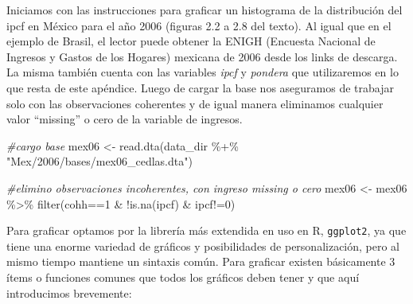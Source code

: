 \documentclass[
]{book}
\newenvironment{Shaded}{\begin{snugshade}}{\end{snugshade}}
\newcommand{\CommentTok}[1]{\textcolor[rgb]{0.56,0.35,0.01}{\textit{#1}}}
\newcommand{\DecValTok}[1]{\textcolor[rgb]{0.00,0.00,0.81}{#1}}
\newcommand{\FunctionTok}[1]{\textcolor[rgb]{0.00,0.00,0.00}{#1}}
\newcommand{\NormalTok}[1]{#1}
\newcommand{\OtherTok}[1]{\textcolor[rgb]{0.56,0.35,0.01}{#1}}
\newcommand{\SpecialCharTok}[1]{\textcolor[rgb]{0.00,0.00,0.00}{#1}}
\newcommand{\StringTok}[1]{\textcolor[rgb]{0.31,0.60,0.02}{#1}}
\begin{document}
Iniciamos con las instrucciones para graficar un histograma de la distribución del ipcf en México para el año 2006 (figuras 2.2 a 2.8 del texto). Al igual que en el ejemplo de Brasil, el lector puede obtener la ENIGH (Encuesta Nacional de Ingresos y Gastos de los Hogares) mexicana de 2006 desde los links de descarga. La misma también cuenta con las variables \emph{ipcf} y \emph{pondera} que utilizaremos en lo que resta de este apéndice. Luego de cargar la base nos aseguramos de trabajar solo con las observaciones coherentes y de igual manera eliminamos cualquier valor ``missing'' o cero de la variable de ingresos.

\begin{Shaded}
\begin{Highlighting}[]
\CommentTok{\#cargo base}
\NormalTok{mex06 }\OtherTok{\textless{}{-}} \FunctionTok{read.dta}\NormalTok{(data\_dir }\SpecialCharTok{\%+\%} \StringTok{"Mex/2006/bases/mex06\_cedlas.dta"}\NormalTok{)  }

\CommentTok{\#elimino observaciones incoherentes, con ingreso missing o cero}
\NormalTok{mex06 }\OtherTok{\textless{}{-}}\NormalTok{ mex06 }\SpecialCharTok{\%\textgreater{}\%} \FunctionTok{filter}\NormalTok{(cohh}\SpecialCharTok{==}\DecValTok{1} \SpecialCharTok{\&} \SpecialCharTok{!}\FunctionTok{is.na}\NormalTok{(ipcf) }\SpecialCharTok{\&}\NormalTok{ ipcf}\SpecialCharTok{!=}\DecValTok{0}\NormalTok{) }
\end{Highlighting}
\end{Shaded}

Para graficar optamos por la librería más extendida en uso en R, \texttt{ggplot2}, ya que tiene una enorme variedad de gráficos y posibilidades de personalización, pero al mismo tiempo mantiene un sintaxis común. Para graficar existen básicamente 3 ítems o funciones comunes que todos los gráficos deben tener y que aquí introducimos brevemente:
\end{document}
